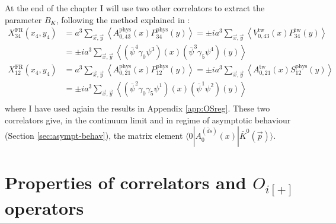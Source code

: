 \documentclass[english, LaM, oneside, noexaminfo]{sapthesis}
\newcommand{\la}{\langle}
\newcommand{\ra}{\rangle}
\begin{document}
At the end of the chapter I will use two other correlators to extract the parameter $B_K$, following the method explained in \cite{B_k-extrapolation}:
\begin{equation}\label{eq:axial-correlators}
    \begin{split}
        X_{34}^\text{FR}(x_4,y_4) & = a^3 \sum_{\vec x, \vec y} \left\la A_{0,43}^\text{phys} (x) P_{34}^\text{phys} (y) \right\ra = \pm i a^3 \sum_{\vec x, \vec y} \left\la V_{0,43}^\text{tw} (x) P_{34}^\text{tw} (y) \right\ra \\
                                  & = \pm i a^3 \sum_{\vec x, \vec y} \left\la \left( \bar \psi^4 \gamma_0 \psi^3 \right) (x) \left( \bar \psi^3 \gamma_5 \psi^4 \right) (y) \right\ra \\
        X_{12}^\text{FR}(x_4,y_4) & = a^3 \sum_{\vec x, \vec y} \left\la A_{0,21}^\text{phys} (x) P_{12}^\text{phys} (y) \right\ra = \pm i a^3 \sum_{\vec x, \vec y} \left\la A_{0,21}^\text{tw} (x) S_{12}^\text{phys} (y) \right\ra \\
                                  & = \pm i a^3 \sum_{\vec x, \vec y} \left\la \left( \bar \psi^2 \gamma_0 \gamma_5 \psi^1 \right) (x) \left( \bar \psi^1 \psi^2 \right) (y) \right\ra \\
    \end{split}
\end{equation}
where I have used agiain the results in Appendix \ref{app:OSreg}.
These two correlators give, in the continuum limit and in regime of asymptotic behaviour (Section \ref{sec:asympt-behav}), the matrix element $\la 0 | A_0^{(\bar d s)} (x) | \bar K^0 (\vec p) \ra$.

\section{Properties of correlators and $O_{i[+]}$ operators}\label{sec:operators-properties}
\end{document}
